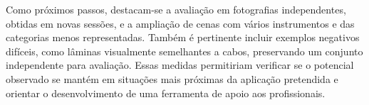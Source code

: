 Como próximos passos, destacam-se a avaliação em fotografias independentes, obtidas em novas sessões, e a ampliação de cenas com vários instrumentos e das categorias menos representadas. Também é pertinente incluir exemplos negativos difíceis, como lâminas visualmente semelhantes a cabos, preservando um conjunto independente para avaliação. Essas medidas permitiriam verificar se o potencial observado se mantém em situações mais próximas da aplicação pretendida e orientar o desenvolvimento de uma ferramenta de apoio aos profissionais.

\endgroup